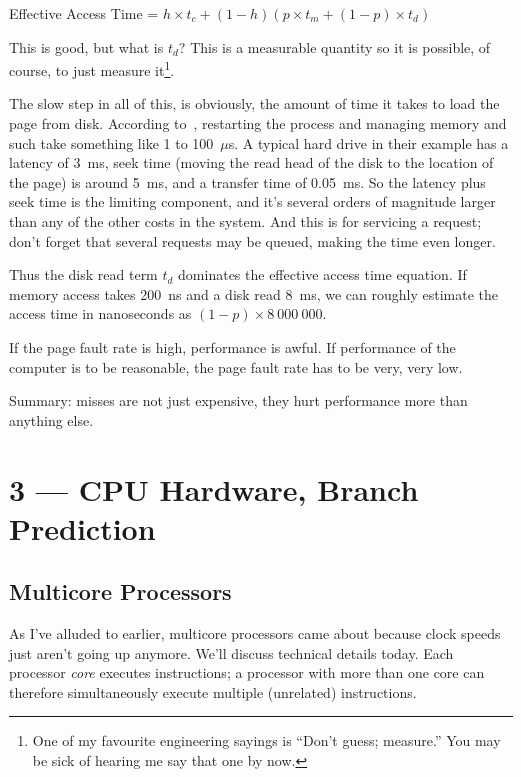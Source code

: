 \documentclass[a4paper]{report}
\begin{document}
\begin{center}
	Effective Access Time = $ h \times t_{c} + (1 - h) ( p \times t_{m} + (1 - p) \times t_{d})$
\end{center}

This is good, but what is $t_{d}$? This is a measurable quantity so it is possible, of course, to just measure it\footnote{One of my favourite engineering sayings is ``Don't guess; measure.'' You may be sick of hearing me say that one by now.}.

The slow step in all of this, is obviously, the amount of time it takes to load the page from disk. According to~\cite{osc}, restarting the process and managing memory and such take something like 1 to 100~$\mu$s. A typical hard drive in their example has a latency of 3~ms, seek time (moving the read head of the disk to the location of the page) is around 5~ms, and a transfer time of 0.05~ms. So the latency plus seek time is the limiting component, and it's several orders of magnitude larger than any of the other costs in the system. And this is for servicing a request; don't forget that several requests may be queued, making the time even longer.

Thus the disk read term $t_{d}$ dominates the effective access time equation. If memory access takes 200~ns and a disk read 8~ms, we can roughly estimate the access time in nanoseconds as $(1-p) \times 8~000~000$. 

If the page fault rate is high, performance is awful. If performance of the computer is to be reasonable, the page fault rate has to be very, very low.

Summary: misses are not just expensive, they hurt performance more than anything else.










\chapter*{3 --- CPU Hardware, Branch Prediction}


\section*{Multicore Processors}
As I've alluded to earlier, multicore processors came about because
clock speeds just aren't going up anymore. We'll discuss technical
details today. Each processor \emph{core} executes instructions; a processor with more than one core can therefore simultaneously execute multiple
(unrelated) instructions. 
\end{document}
